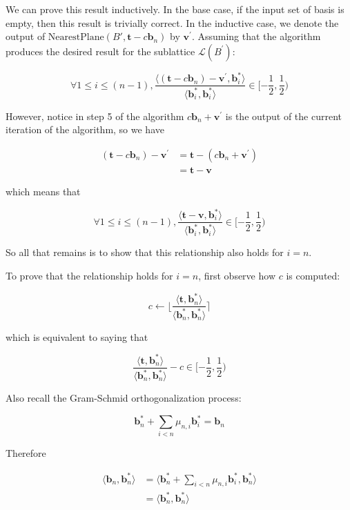 \documentclass[letterpaper,12pt]{article}
\begin{document}
We can prove this result inductively. In the base case, if the input set of basis is empty, then this result is trivially correct. In the inductive case, we denote the output of $\text{NearestPlane}(B', \mathbf{t} - c\mathbf{b}_n)$ by $\mathbf{v}^\prime$. Assuming that the algorithm produces the desired result for the sublattice $\mathcal{L}(B^\prime)$:

$$
\forall 1 \leq i \leq (n-1), 
\frac{
    \langle
        (\mathbf{t} - c\mathbf{b}_n) - \mathbf{v}^\prime, 
        \mathbf{b}_i^\ast
    \rangle
}{
    \langle
        \mathbf{b}_i^\ast, \mathbf{b}_i^\ast
    \rangle
} \in [-\frac{1}{2}, \frac{1}{2})
$$

However, notice in step 5 of the algorithm $c\mathbf{b}_n + \mathbf{v}^\prime$ is the output of the current iteration of the algorithm, so we have

$$
\begin{aligned}
(\mathbf{t} - c\mathbf{b}_n) - \mathbf{v}^\prime 
&= \mathbf{t} - (c\mathbf{b}_n + \mathbf{v}^\prime) \\
&= \mathbf{t} - \mathbf{v}
\end{aligned}
$$

which means that

$$
\forall 1 \leq i \leq (n-1), 
\frac{
    \langle
        \mathbf{t} - \mathbf{v}, 
        \mathbf{b}_i^\ast
    \rangle
}{
    \langle
        \mathbf{b}_i^\ast, \mathbf{b}_i^\ast
    \rangle
} \in [-\frac{1}{2}, \frac{1}{2})
$$

So all that remains is to show that this relationship also holds for $i = n$.

To prove that the relationship holds for $i = n$, first observe how $c$ is computed:

$$
c \leftarrow \lfloor \frac{\langle\mathbf{t}, \mathbf{b}_n^\ast\rangle}{\langle\mathbf{b}_n^\ast, \mathbf{b}_n^\ast\rangle} \rceil
$$

which is equivalent to saying that

$$
\frac{
    \langle\mathbf{t}, \mathbf{b}_n^\ast\rangle
}{
    \langle\mathbf{b}_n^\ast, \mathbf{b}_n^\ast\rangle
}
- c \in [-\frac{1}{2}, \frac{1}{2})
$$

Also recall the Gram-Schmid orthogonalization process:

$$
\mathbf{b}_n^\ast +\sum_{i<n}\mu_{n, i}\mathbf{b}_i^\ast = \mathbf{b}_n
$$

Therefore

$$
\begin{aligned}
\langle\mathbf{b}_n, \mathbf{b}_n^\ast\rangle
&= \langle 
    \mathbf{b}_n^\ast +\sum_{i<n}\mu_{n, i}\mathbf{b}_i^\ast, \mathbf{b}_n^\ast
\rangle \\
&= \langle\mathbf{b}_n^\ast, \mathbf{b}_n^\ast\rangle
\end{aligned}
$$
\end{document}
